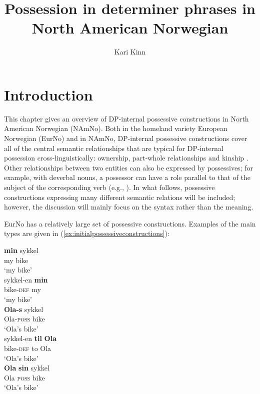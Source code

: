\documentclass[output=paper,colorlinks,citecolor=brown]{langscibook}
\author{Kari Kinn\orcid{}\affiliation{University of Bergen}}
\title{Possession in determiner phrases in North American Norwegian}
\begin{document}
\maketitle

\section{Introduction}\label{kinn-intro}
\begin{sloppypar}
This chapter gives an overview of DP-internal possessive constructions in North American Norwegian (NAmNo). Both in the homeland variety European Norwegian (EurNo) and in NAmNo, DP-internal possessive constructions cover all of the central semantic relationships that are typical for DP-internal possession cross\hyp linguistically: ownership, part-whole relationships and kinship \citep[263--264]{dixon2010basic}. Other relationships between two entities can also be expressed by possessives; for example, with deverbal nouns, a possessor can have a role parallel to that of the subject of the corresponding verb  (e.g., \citealt{chomsky1970remarks}). In what follows,  possessive constructions expressing many different semantic relations will be included; however, the discussion will mainly focus on the syntax rather than the meaning.
\end{sloppypar}


EurNo has a relatively large set of possessive constructions. Examples of the main types are given in (\ref{ex:initialpossessiveconstructions}):

\begin{multicols}{2}
\ea \label{ex:initialpossessiveconstructions}
\ea \label{ex:minsykkel} \gll \textbf{min} sykkel \\
my bike\\
\glt `my bike'\\
\ex \label{ex:sykkelenmin} \gll sykkel-en \textbf{min} \\
bike-\textsc{def} my \\
\glt `my bike'\\
\ex \label{ex:olassykkel} \gll \textbf{Ola-s} sykkel \\
Ola-\textsc{poss} bike \\
\glt `Ola's bike' \\
\ex \label{ex:sykkelentilola} \gll sykkel-en \textbf{til} \textbf{Ola} \\
bike-\textsc{def} to Ola \\
\glt `Ola's bike' \\
\ex \label{ex:olasinsykkel} \gll \textbf{Ola} \textbf{sin} sykkel\\
Ola \textsc{poss} bike \\
\glt `Ola's bike' \\
\z
\z
\end{multicols}
\end{document}
